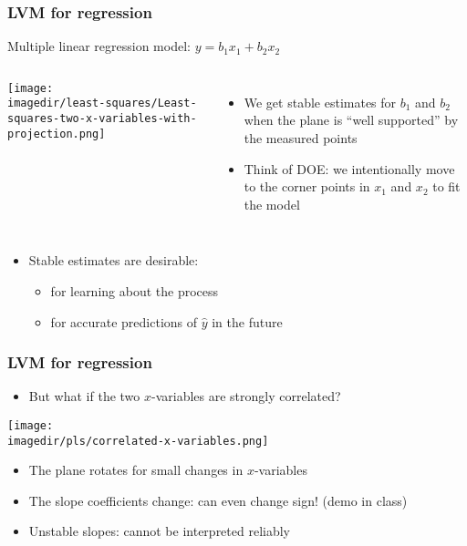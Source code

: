 \begin{frame}\frametitle{LVM for regression}

	Multiple linear regression model: $y = b_1x_1 + b_2x_2$
	\begin{columns}
		\column{6cm}
		\texttt{[image: \\imagedir/least-squares/Least-squares-two-x-variables-with-projection.png]} \column{4cm}
		\begin{itemize}
			\item	We get stable estimates for $b_1$ and $b_2$ when the plane is ``well supported'' by the measured points
			\item	Think of DOE: we intentionally move to the corner points in $x_1$ and $x_2$ to fit the model
		\end{itemize}
	\end{columns}
	\begin{itemize}
		\item	Stable estimates are desirable:
		\begin{itemize}
			\item	for learning about the process
			\item	for accurate predictions of $\hat{y}$ in the future
		\end{itemize}
	\end{itemize}
\end{frame}

\begin{frame}\frametitle{LVM for regression}
	\begin{itemize}
		\item	But what if the two $x$-variables are strongly correlated?
	\end{itemize}

	\texttt{[image: \\imagedir/pls/correlated-x-variables.png]}
	\begin{itemize}
		\item	The plane rotates for small changes in $x$-variables
		\item	The slope coefficients change: can even change sign! (demo in class)
		\item	Unstable slopes: cannot be interpreted reliably
	\end{itemize}
\end{frame}

